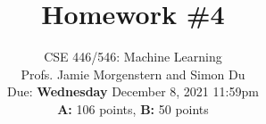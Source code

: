 \documentclass{article}
\begin{document}
\setcounter{aprob}{0}
\setcounter{bprob}{0}
\title{Homework \#4}
\author{
    \normalsize{CSE 446/546: Machine Learning}\\
    \normalsize{Profs. Jamie Morgenstern and Simon Du}\\
    \normalsize{Due: \textbf{Wednesday} December 8, 2021 11:59pm}\\
    \normalsize{\textbf{A:} 106 points, \textbf{B:} 50 points}
}
\date{{}}
\maketitle

\end{document}
